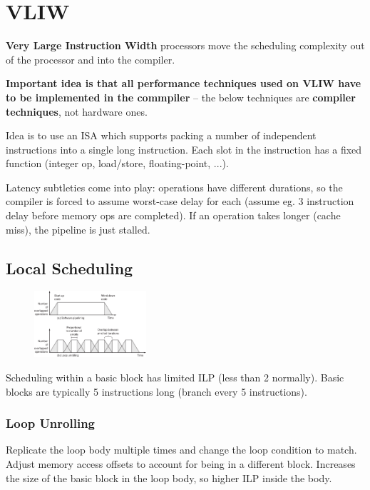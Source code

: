\documentclass[a4paper, 11pt]{article}
\begin{document}
\section*{VLIW}
{
    \textbf{Very Large Instruction Width} processors move the scheduling complexity out of the processor and into the compiler.

    \textbf{Important idea is that all performance techniques used on VLIW have to be implemented in the commpiler} -- the below techniques are \textbf{compiler techniques}, not hardware ones.

    Idea is to use an ISA which supports packing a number of independent instructions into a single long instruction. Each slot in the instruction has a fixed function (integer op, load/store, floating-point, ...).

    Latency subtleties come into play: operations have different durations, so the compiler is forced to assume worst-case delay for each (assume eg. 3 instruction delay before memory ops are completed). If an operation takes longer (cache miss), the pipeline is just stalled.

    \subsection*{Local Scheduling}
    {
        \begin{figure}
        \centering
        \includegraphics[width=0.37\textwidth]{software-pipelining.png}
        \end{figure}

        Scheduling within a basic block has limited ILP (less than 2 normally). Basic blocks are typically 5 instructions long (branch every 5 instructions).

        \subsubsection*{Loop Unrolling}
        {
            Replicate the loop body multiple times and change the loop condition to match. Adjust memory access offsets to account for being in a different block. Increases the size of the basic block in the loop body, so higher ILP inside the body.

}}}
\end{document}

